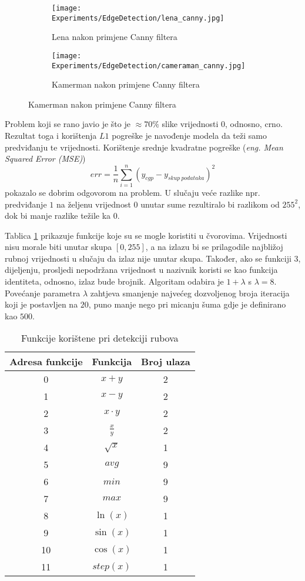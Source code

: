 \begin{figure}
	\centering
	\caption{Fotografije Lene i Kamermana nakon primjene detekcije ruba \emph{Canny} algoritmom}
	\begin{subfigure}[t]{0.45\textwidth}
		\texttt{[image: Experiments/EdgeDetection/lena\_canny.jpg]}
		\caption{Lena nakon primjene Canny filtera}
		\label{fig:lena_canny}
	\end{subfigure}
	\begin{subfigure}[t]{0.45\textwidth}
		\texttt{[image: Experiments/EdgeDetection/cameraman\_canny.jpg]}
		\caption{Kamerman nakon primjene Canny filtera}
		\label{fig:camerman_canny}
	\end{subfigure}
	\label{fig:edge_detection_train_val_in}
\end{figure}

Problem koji se rano javio je što je $\approx 70\%$ slike vrijednosti $0$, odnosno, crno.
Rezultat toga i korištenja $L1$ pogreške je navođenje modela da teži samo predviđanju te vrijednosti.
Korištenje srednje kvadratne pogreške (\emph{eng. Mean Squared Error (MSE)})
$$err = \frac{1}{n}\sum_{i=1}^{n}(y_{cgp} - y_{skup\ podataka})^2$$
pokazalo se dobrim odgovorom na problem.
U slučaju veće razlike npr. predviđanje $1$ na željenu vrijednost $0$ unutar sume rezultiralo bi razlikom od $255^2$, dok bi manje razlike težile ka $0$.

Tablica \ref{table:edge_detection_function_set} prikazuje funkcije koje su se mogle koristiti u čvorovima.
Vrijednosti nisu morale biti unutar skupa $[0, 255]$, a na izlazu bi se prilagodile najbližoj rubnoj vrijednosti u slučaju da izlaz nije unutar skupa.
Također, ako se funkciji $3$, dijeljenju, prosljedi nepodržana vrijednost u nazivnik koristi se kao funkcija identiteta, odnosno, izlaz bude brojnik.
Algoritam odabira je $1 + \lambda$ s $\lambda = 8$.
Povećanje parametra $\lambda$ zahtjeva smanjenje najvećeg dozvoljenog broja iteracija koji je postavljen na $20$, puno manje nego pri micanju šuma gdje je definirano kao $500$.

\begin{table}
	\centering
	\begin{tabular}{||c c c||}
		\hline
		Adresa funkcije & Funkcija & Broj ulaza \\ [0.5ex]
		\hline \hline
		0 & $x + y$ & 2 \\
		1 & $x - y$ & 2 \\
		2 & $x \cdot y$ & 2 \\
		3 & $\frac{x}{y}$ & 2 \\
		4 & $\sqrt{x}$ & 1 \\
		5 & $avg$ & 9 \\
		6 & $min$ & 9 \\
		7 & $max$ & 9 \\
		8 & $\ln(x)$ & 1 \\
		9 & $\sin(x)$ & 1 \\
		10 & $\cos(x)$ & 1 \\
		11 & $step(x)$ & 1 \\ [1ex]
		\hline
	\end{tabular}
	\caption{Funkcije korištene pri detekciji rubova}
	\label{table:edge_detection_function_set}
\end{table}

